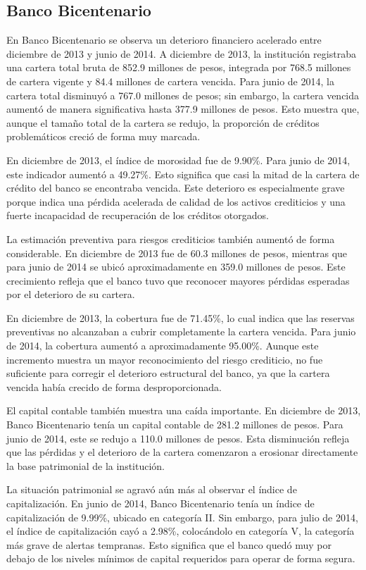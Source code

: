 \subsection{Banco Bicentenario}

En Banco Bicentenario se observa un deterioro financiero acelerado entre diciembre de 2013 y junio de 2014. A diciembre de 2013, la institución registraba una cartera total bruta de 852.9 millones de pesos, integrada por 768.5 millones de cartera vigente y 84.4 millones de cartera vencida. Para junio de 2014, la cartera total disminuyó a 767.0 millones de pesos; sin embargo, la cartera vencida aumentó de manera significativa hasta 377.9 millones de pesos. Esto muestra que, aunque el tamaño total de la cartera se redujo, la proporción de créditos problemáticos creció de forma muy marcada.


En diciembre de 2013, el índice de morosidad fue de 9.90\%. Para junio de 2014, este indicador aumentó a 49.27\%. Esto significa que casi la mitad de la cartera de crédito del banco se encontraba vencida. Este deterioro es especialmente grave porque indica una pérdida acelerada de calidad de los activos crediticios y una fuerte incapacidad de recuperación de los créditos otorgados.

La estimación preventiva para riesgos crediticios también aumentó de forma considerable. En diciembre de 2013 fue de 60.3 millones de pesos, mientras que para junio de 2014 se ubicó aproximadamente en 359.0 millones de pesos. Este crecimiento refleja que el banco tuvo que reconocer mayores pérdidas esperadas por el deterioro de su cartera.


En diciembre de 2013, la cobertura fue de 71.45\%, lo cual indica que las reservas preventivas no alcanzaban a cubrir completamente la cartera vencida. Para junio de 2014, la cobertura aumentó a aproximadamente 95.00\%. Aunque este incremento muestra un mayor reconocimiento del riesgo crediticio, no fue suficiente para corregir el deterioro estructural del banco, ya que la cartera vencida había crecido de forma desproporcionada.

El capital contable también muestra una caída importante. En diciembre de 2013, Banco Bicentenario tenía un capital contable de 281.2 millones de pesos. Para junio de 2014, este se redujo a 110.0 millones de pesos. Esta disminución refleja que las pérdidas y el deterioro de la cartera comenzaron a erosionar directamente la base patrimonial de la institución.

La situación patrimonial se agravó aún más al observar el índice de capitalización. En junio de 2014, Banco Bicentenario tenía un índice de capitalización de 9.99\%, ubicado en categoría II. Sin embargo, para julio de 2014, el índice de capitalización cayó a 2.98\%, colocándolo en categoría V, la categoría más grave de alertas tempranas. Esto significa que el banco quedó muy por debajo de los niveles mínimos de capital requeridos para operar de forma segura.

